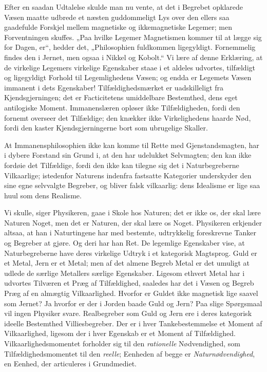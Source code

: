 \documentclass[12pt,a4paper]{book}
\begin{document}
Efter en saadan Udtalelse skulde man nu vente, at det i Begrebet
opklarede Væsen maatte udbrede et næsten guddommeligt Lys over den
ellers saa gaadefulde Forskjel mellem magnetiske og ikkemagnetiske
Legemer; men Forventningen skuffes. „Paa hvilke Legemer Magnetismen
kommer til at lægge sig for Dagen, er“, hedder det, „Philosophien
fuldkommen ligegyldigt. Fornemmelig findes den i Jernet, men ogsaa i
Nikkel og Kobolt.“ Vi lære af denne Erklæring, at de virkelige
Legemers virkelige Egenskaber staae i et aldeles udvortes, tilfældigt
og ligegyldigt Forhold til Legemlighedens Væsen; og endda er Legemets
Væsen immanent i dets Egenskaber! Tilfældighedsmærket er uadskilleligt
fra Kjendsgjerningen; det er Facticitetens umiddelbare Bestemthed,
dens eget antilogiske Moment. Immanenslæren opløser ikke
Tilfældigheden, fordi den fornemt overseer det Tilfældige; den knækker
ikke Virkelighedens haarde Nød, fordi den kaster Kjendsgjerningerne
bort som ubrugelige Skaller.

At Immanensphilosophien ikke kan komme til Rette med
Gjenstandsmagten, har i dybere Forstand sin Grund i, at den har
udelukket Selvmagten; den kan ikke fordøie det Tilfældige, fordi den
ikke kan tilegne sig det i Naturbegreberne Vilkaarlige; istedenfor
Naturens indenfra fastsatte Kategorier underskyder den sine egne
selvvalgte Begreber, og bliver falsk vilkaarlig: dens Idealisme er
lige saa huul som dens Realisme.

Vi skulle, siger Physikeren, gaae i Skole hos Naturen; det er ikke os,
der skal lære Naturen Noget, men det er Naturen, der skal lære os
Noget. Physikeren erkjender altsaa, at han i Naturtingene har med
bestemte, udtrykkelig foreskrevne Tanker og Begreber at gjøre. Og deri
har han Ret. De legemlige Egenskaber vise, at Naturbegreberne
have deres virkelige Udtryk i et kategorisk Magtsprog. Guld er et
Metal, Jern er et Metal; men af det almene Begreb Metal er det umuligt
at udlede de særlige Metallers særlige Egenskaber. Ligesom ethvert
Metal har i udvortes Tilværen et Præg af Tilfældighed, saaledes har
det i Væsen og Begreb Præg af en almægtig Vilkaarlighed. Hvorfor er
Guldet ikke magnetisk lige saavel som Jernet? Ja hvorfor er der i
Jorden baade Guld og Jern? Paa slige Spørgsmaal vil ingen Physiker
svare. Realbegreber som Guld og Jern ere i deres kategorisk ideelle
Bestemthed Villiesbegreber. Der er i hver Tankebestemmelse et Moment
af Vilkaarlighed, ligesom der i hver Egenskab er et Moment af
Tilfældighed.
Vilkaarlighedsmomentet forholder sig til den \emph{rationelle}
Nødvendighed, som Tilfældighedsmomentet til den \emph{reelle};
Eenheden af begge er \emph{Naturnødvendighed}, en Eenhed, der
articuleres i Grundmediet.
\end{document}
